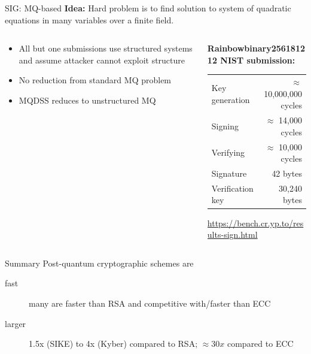 \documentclass[xcolor=table,10pt,aspectratio=169]{beamer}
\begin{document}
\begin{frame}[label={sec:org32912a2}]{SIG: MQ-based}
\textbf{Idea:} Hard problem is to find solution to system of quadratic equations in many variables over a finite field.

\begin{columns}[t]
\begin{column}{0.5\columnwidth}
\begin{itemize}
\item All but one submissions use structured systems and assume attacker cannot exploit structure
\item No reduction from standard MQ problem
\item MQDSS reduces to unstructured MQ
\end{itemize}
\end{column}

\begin{column}{0.5\columnwidth}
\textbf{Rainbowbinary256181212 NIST submission:}

\begin{center}
\begin{tabular}{lr}
Key generation & \(\approx\) 10,000,000 cycles\\
Signing & \(\approx\)   14,000 cycles\\
Verifying & \(\approx\)   10,000 cycles\\
Signature & 42 bytes\\
Verification key & 30,240 bytes\\
\end{tabular}

\end{center}

\small \url{https://bench.cr.yp.to/results-sign.html}
\end{column}
\end{columns}
\end{frame}

\begin{frame}[label={sec:org95bc7b2}]{Summary}
Post-quantum cryptographic schemes are

\begin{description}
\item[{fast}] many are faster than RSA and competitive with/faster than ECC
\item[{larger}] 1.5x (SIKE) to 4x (Kyber) compared to RSA; \(\approx 30x\) compared to ECC
\end{description}
\end{frame}
\end{document}
